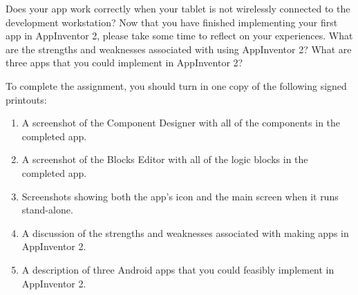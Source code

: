 Does your app work correctly when your tablet is not wirelessly connected to the development workstation? Now that you
have finished implementing your first app in AppInventor 2, please take some time to reflect on your experiences.  What
are the strengths and weaknesses associated with using AppInventor 2? What are three apps that you could implement in
AppInventor 2?


\vspace*{.05in}
\noindent
To complete the assignment, you should turn in one copy of the following signed printouts: 
\vspace*{-.06in}

\begin{enumerate}
	\itemsep0em
	\item A screenshot of the Component Designer with all of the components in the completed app.
	\item A screenshot of the Blocks Editor with all of the logic blocks in the completed app. 
	\item Screenshots showing both the app's icon and the main screen when it runs stand-alone.
	\item A discussion of the strengths and weaknesses associated with making apps in AppInventor 2.
	\item A description of three Android apps that you could feasibly implement in AppInventor 2.
\end{enumerate}

% 
% 		
% 
% 
% 
% 
% 

